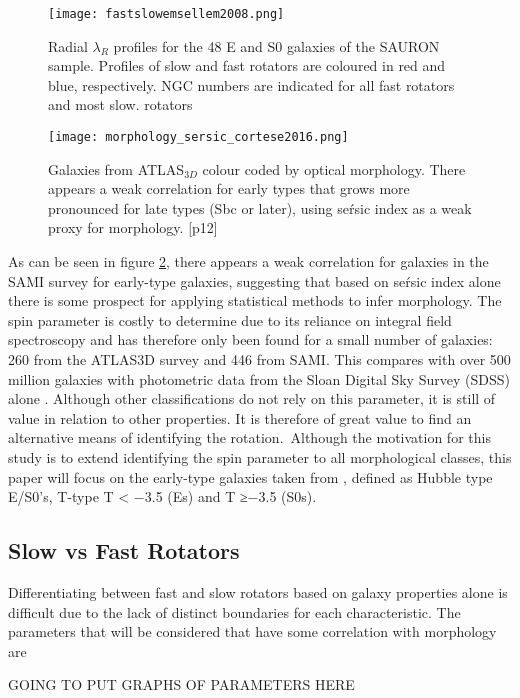 \begin{figure}[h]
	\caption{Radial $\lambda_{R}$ profiles for the 48 E and S0 galaxies of the SAURON
	sample. Profiles of slow and fast rotators are coloured in red and blue, respectively.
	NGC numbers are indicated for all fast rotators and most slow.
	rotators \cite[p.6]{Emsellem2011}}
	\centering
	\texttt{[image: fastslowemsellem2008.png]}
	\label{fig:morphsplit}
\end{figure}

\begin{figure}[h]
	\caption{Galaxies from ATLAS$_{3D}$ colour coded by optical morphology. There appears a weak correlation for early types that grows more pronounced for late types (Sbc or later), using se\'rsic index as a weak proxy for morphology.	
		\cite{Cortese2016}[p12]}
	\centering
	\texttt{[image: morphology\_sersic\_cortese2016.png]}
	\label{fig:morphologysersic}
\end{figure}

As can be seen in figure \ref{fig:morphologysersic}, there appears a weak correlation for galaxies in the SAMI survey for early-type galaxies, suggesting that based on se\'rsic index alone there is some prospect for applying statistical methods to infer morphology.
The spin parameter is costly to determine due to its reliance on integral field spectroscopy and has therefore only been found for a small number of galaxies: 260 from the ATLAS3D survey and 446 from SAMI. This compares with over 500 million galaxies with photometric data from the Sloan Digital Sky Survey (SDSS) alone \cite{SDSS}. Although other classifications do not rely on this parameter, it is still of value in relation to other properties. It is therefore of great value to find an alternative means of identifying the rotation.\
Although the motivation for this study is to extend identifying the spin parameter to all morphological classes, this paper will focus on the early-type galaxies taken from \cite{Emsellem2011}, defined as Hubble type E/S0's, T-type T < −3.5 (Es) and T ≥−3.5 (S0s).
\subsection{Slow vs Fast Rotators}
Differentiating between fast and slow rotators based on galaxy properties alone is difficult due to the lack of distinct boundaries for each characteristic. The parameters that will be considered that have some correlation with morphology are

GOING TO PUT GRAPHS OF PARAMETERS HERE


